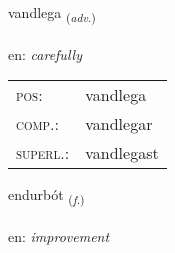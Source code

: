 \documentclass[frontgrid, backgrid]{flacards}\usepackage[]{graphicx}\usepackage[]{xcolor}
\begin{document}
\renewcommand{\flhead}{\vskip5pt \fboxsep=0pt {\small\bfseries\footnotesize Atviksorð | Adverb}}
\renewcommand{\fcfoot}{\vskip5pt \fboxsep=0pt \hspace{2pt}{\small\bfseries\footnotesize 3K}}

\renewcommand{\blhead}{\vskip5pt {\small\bfseries\footnotesize Atviksorð | Adverb }}
\renewcommand{\bcfoot}{\vskip5pt \hspace{2pt}{\small\bfseries\footnotesize 3K}}


{vandlega \small{\textsubscript{(\textit{adv.})}} \\[1ex] %
\textphonetic{[vantlɛɣa]} \\
en: \emph{carefully} \\  [2ex]
\renewcommand*{\arraystretch}{0.8}
\begin{tabular}{ll}
\textsc{pos}: & vandlega \\ 
\textsc{comp.}: & vandlegar \\ 
\textsc{superl.}: & vandlegast \\
\end{tabular}
}

\renewcommand{\flhead}{\vskip5pt \fboxsep=0pt {\small\bfseries\footnotesize Nafnorð | Noun}}
\renewcommand{\fcfoot}{\vskip5pt \fboxsep=0pt \hspace{2pt}{\small\bfseries\footnotesize 3K}}

\renewcommand{\blhead}{\vskip5pt {\small\bfseries\footnotesize Nafnorð | Noun }}
\renewcommand{\bcfoot}{\vskip5pt \hspace{2pt}{\small\bfseries\footnotesize 3K}}


{endurbót \small{\textsubscript{(\textit{f.})}} \\[1ex] %
\textphonetic{[ɛntʏrpout]} \\
en: \emph{improvement} \\  [2ex]
\renewcommand*{\arraystretch}{0.8}
}
\end{document}
